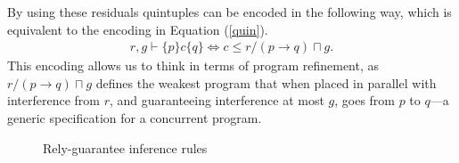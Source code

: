 \documentclass{llncs}
\begin{document}
By using these residuals quintuples can be encoded in the following way,
which is equivalent to the encoding in Equation (\ref{quin}).
\begin{align}
r, g \vdash \{p\} c \{q\} \iff c \le r/(p \rightarrow q) \sqcap g \label{refine}.
\end{align}
This encoding allows us to think in terms of program refinement, as
$r/(p \rightarrow q) \sqcap g$ defines the weakest program that when
placed in parallel with interference from $r$, and guaranteeing
interference at most $g$, goes from $p$ to $q$---a generic
specification for a concurrent program.

\begin{figure}[tbh]
\centering
\begin{prooftree}
\end{prooftree}

\begin{prooftree}
\end{prooftree}

\begin{prooftree}
\end{prooftree}

\begin{prooftree}
\end{prooftree}

\begin{prooftree}
\end{prooftree}

\begin{prooftree}
\end{prooftree}
\caption{Rely-guarantee inference rules}
\label{fig:rgrules}
\end{figure}
\end{document}
